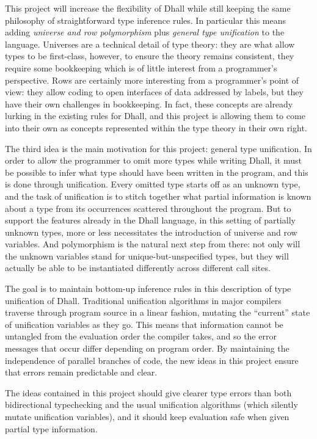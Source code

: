 \documentclass[11pt, twoside, reqno]{book}
\begin{document}
This project will increase the flexibility of Dhall while still keeping the same philosophy of straightforward type inference rules.
In particular this means adding \emph{universe and row polymorphism} plus \emph{general type unification} to the language.
Universes are a technical detail of type theory: they are what allow types to be first-class, however, to ensure the theory remains consistent, they require some bookkeeping which is of little interest from a programmer's perspective.
Rows are certainly more interesting from a programmer's point of view: they allow coding to open interfaces of data addressed by labels, but they have their own challenges in bookkeeping.
In fact, these concepts are already lurking in the existing rules for Dhall, and this project is allowing them to come into their own as concepts represented within the type theory in their own right.

The third idea is the main motivation for this project: general type unification.
In order to allow the programmer to omit more types while writing Dhall, it must be possible to infer what type should have been written in the program, and this is done through unification.
Every omitted type starts off as an unknown type, and the task of unification is to stitch together what partial information is known about a type from its occurrences scattered throughout the program.
But to support the features already in the Dhall language, in this setting of partially unknown types, more or less necessitates the introduction of universe and row variables.
And polymorphism is the natural next step from there: not only will the unknown variables stand for unique-but-unspecified types, but they will actually be able to be instantiated differently across different call sites.

The goal is to maintain bottom-up inference rules in this description of type unification of Dhall.
Traditional unification algorithms in major compilers traverse through program source in a linear fashion, mutating the ``current'' state of unification variables as they go.
This means that information cannot be untangled from the evaluation order the compiler takes, and so the error messages that occur differ depending on program order.
By maintaining the independence of parallel branches of code, the new ideas in this project ensure that errors remain predictable and clear.

The ideas contained in this project should give clearer type errors than both bidirectional typechecking and the usual unification algorithms (which silently mutate unification variables), and it should keep evaluation safe when given partial type information.
\end{document}
